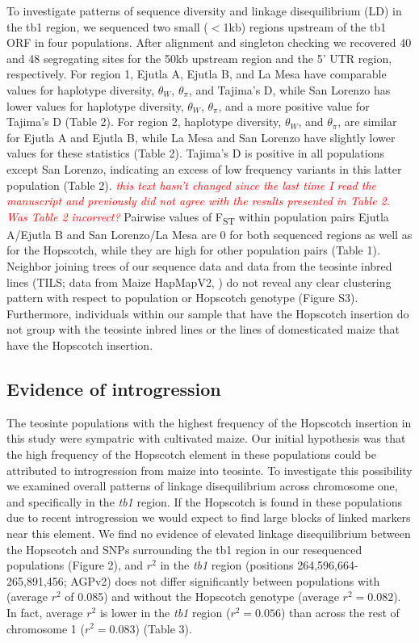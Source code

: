 \documentclass[12pt]{article}
\newcommand{\mbh}[1]{\textcolor{red}{ \emph{\scriptsize  #1}} }
\begin{document}
To investigate patterns of sequence diversity and linkage disequilibrium (LD) in the tb1 region, we sequenced two small ($<$1kb) regions upstream of the tb1 ORF in four populations. After alignment and singleton checking we recovered 40 and 48 segregating sites for the 50kb upstream region and the 5' UTR region, respectively. For region 1, Ejutla A, Ejutla B, and La Mesa have comparable values for haplotype diversity, $\theta_{W}$, $\theta_{\pi}$, and Tajima's D, while San Lorenzo has lower values for haplotype diversity, $\theta_{W}$, $\theta_{\pi}$, and a more positive value for Tajima's D (Table 2). For region 2, haplotype diversity, $\theta_{W}$, and $\theta_{\pi}$, are similar for Ejutla A and Ejutla B, while La Mesa and San Lorenzo have slightly lower values for these statistics (Table 2). Tajima's D is positive in all populations except San Lorenzo, indicating an excess of low frequency variants in this latter population (Table 2). \mbh{this text hasn't changed since the last time I read the manuscript and previously did not agree with the results presented in Table 2.  Was Table 2 incorrect?} Pairwise values of F\textsubscript{ST} within population pairs Ejutla A/Ejutla B and San Lorenzo/La Mesa are 0 for both sequenced regions as well as for the Hopscotch, while they are high for other population pairs (Table 1). Neighbor joining trees of our sequence data and data from the teosinte inbred lines (TILS; data from Maize HapMapV2, \cite{Chia et al 2012}) do not reveal any clear clustering pattern with respect to population or Hopscotch genotype (Figure S3). Furthermore, individuals within our sample that have the Hopscotch insertion do not group with the teosinte inbred lines or the lines of domesticated maize that have the Hopscotch insertion. 

\subsection*{Evidence of introgression}

The teosinte populations with the highest frequency of the Hopscotch insertion in this study were sympatric with cultivated maize. Our initial hypothesis was that the high frequency of the Hopscotch element in these populations could be attributed to introgression from maize into teosinte. To investigate this possibility we examined overall patterns of linkage disequilibrium across chromosome one, and specifically in the \emph{tb1} region. If the Hopscotch is found in these populations due to recent introgression we would expect to find large blocks of linked markers near this element. We find no evidence of elevated linkage disequilibrium between the Hopscotch and SNPs surrounding the tb1 region in our resequenced populations (Figure 2), and $r^{2}$ in the \emph{tb1} region (positions 264,596,664-265,891,456; AGPv2) does not differ significantly between populations with (average $r^{2}$ of 0.085) and without the Hopscotch genotype (average $r^{2}=0.082$). In fact, average $r^{2}$ is lower in the \emph{tb1} region ($r^{2}=0.056$) than across the rest of chromosome 1 ($r^{2}=0.083$) (Table 3). 
\end{document}
